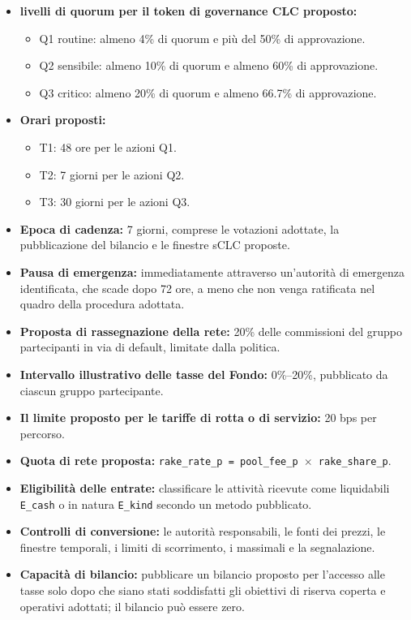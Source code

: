 \documentclass[11pt]{article}
\begin{document}
\begin{itemize}[leftmargin=*]
\item \textbf{livelli di quorum per il token di governance CLC proposto:}
\begin{itemize}[leftmargin=*]
\item Q1 routine: almeno 4\% di quorum e più del 50\% di approvazione.
\item Q2 sensibile: almeno 10\% di quorum e almeno 60\% di approvazione.
\item Q3 critico: almeno 20\% di quorum e almeno 66.7\% di approvazione.
\end{itemize}
\item \textbf{Orari proposti:}
\begin{itemize}[leftmargin=*]
\item T1: 48 ore per le azioni Q1.
\item T2: 7 giorni per le azioni Q2.
\item T3: 30 giorni per le azioni Q3.
\end{itemize}
\item \textbf{Epoca di cadenza:} 7 giorni, comprese le votazioni adottate, la pubblicazione del bilancio e le finestre sCLC proposte.
\item \textbf{Pausa di emergenza:} immediatamente attraverso un'autorità di emergenza identificata, che scade dopo 72 ore, a meno che non venga ratificata nel quadro della procedura adottata.
\item \textbf{Proposta di rassegnazione della rete:} 20\% delle commissioni del gruppo partecipanti in via di default, limitate dalla politica.
\item \textbf{Intervallo illustrativo delle tasse del Fondo:} 0\%--20\%, pubblicato da ciascun gruppo partecipante.
\item \textbf{Il limite proposto per le tariffe di rotta o di servizio:} 20 bps per percorso.
\item \textbf{Quota di rete proposta:} \texttt{rake\_rate\_p = pool\_fee\_p $\times$ rake\_share\_p}.
\item \textbf{Eligibilità delle entrate:} classificare le attività ricevute come liquidabili \texttt{E\_cash} o in natura \texttt{E\_kind} secondo un metodo pubblicato.
\item \textbf{Controlli di conversione:} le autorità responsabili, le fonti dei prezzi, le finestre temporali, i limiti di scorrimento, i massimali e la segnalazione.
\item \textbf{Capacità di bilancio:} pubblicare un bilancio proposto per l'accesso alle tasse solo dopo che siano stati soddisfatti gli obiettivi di riserva coperta e operativi adottati; il bilancio può essere zero.

\end{itemize}
\end{document}
